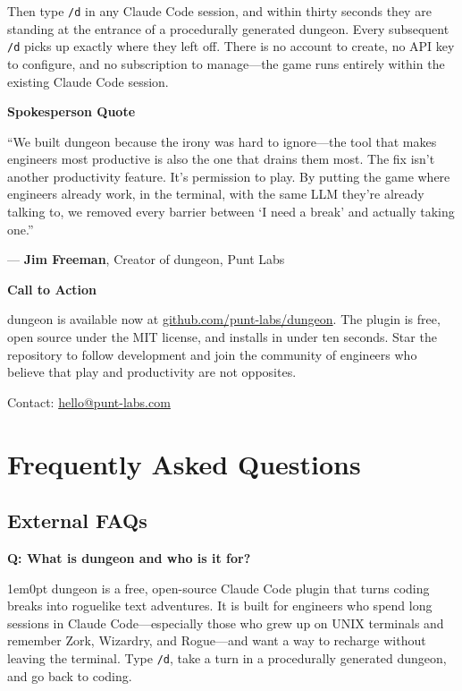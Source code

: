 \documentclass[11pt,letterpaper]{article}
\newcommand{\prsection}[1]{%
  \vspace{1em}%
  {\large\bfseries\color{SectionBlue}#1}%
  \vspace{0.3em}\par%
}
\newcounter{faqnum}
\newenvironment{faqpair}[1]{%
  \needspace{4\baselineskip}%
  \vspace{0.5em}%
  \refstepcounter{faqnum}%
  \noindent\textbf{\color{SectionBlue}Q\thefaqnum: #1}\par\nopagebreak[4]%
  \vspace{0.2em}%
  \begin{adjustwidth}{1em}{0pt}%
  \setlength{\parindent}{0pt}%
}{%
  \end{adjustwidth}%
  \vspace{0.5em}%
}
\begin{document}
\noindent Then type \texttt{/d} in any Claude Code session, and within thirty seconds they are standing at the entrance of a procedurally generated dungeon. Every subsequent \texttt{/d} picks up exactly where they left off. There is no account to create, no API key to configure, and no subscription to manage---the game runs entirely within the existing Claude Code session.

\prsection{Spokesperson Quote}

\begin{spokespersonquote}
``We built dungeon because the irony was hard to ignore---the tool that makes engineers most productive is also the one that drains them most. The fix isn't another productivity feature. It's permission to play. By putting the game where engineers already work, in the terminal, with the same LLM they're already talking to, we removed every barrier between `I need a break' and actually taking one.''

\raggedleft --- \textbf{Jim Freeman}, Creator of dungeon, Punt Labs
\end{spokespersonquote}

\prsection{Call to Action}

dungeon is available now at \href{https://github.com/punt-labs/dungeon}{github.com/punt-labs/dungeon}. The plugin is free, open source under the MIT license, and installs in under ten seconds. Star the repository to follow development and join the community of engineers who believe that play and productivity are not opposites.

\noindent Contact: \href{mailto:hello@punt-labs.com}{hello@punt-labs.com}

\newpage


\section*{Frequently Asked Questions}


\subsection*{External FAQs}

\begin{faqpair}{What is dungeon and who is it for?}\label{faq:what-is-it}
  dungeon is a free, open-source Claude Code plugin that turns coding breaks into roguelike text adventures. It is built for engineers who spend long sessions in Claude Code---especially those who grew up on UNIX terminals and remember Zork, Wizardry, and Rogue---and want a way to recharge without leaving the terminal. Type \texttt{/d}, take a turn in a procedurally generated dungeon, and go back to coding.
\end{faqpair}
\end{document}
